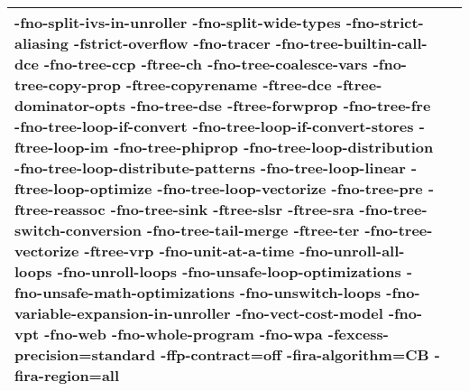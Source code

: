 \begin{tabular}{|l|p{6.2in}|}
-fno-split-ivs-in-unroller -fno-split-wide-types -fno-strict-aliasing \textbf{-fstrict-overflow} -fno-tracer -fno-tree-builtin-call-dce -fno-tree-ccp \textbf{-ftree-ch} -fno-tree-coalesce-vars -fno-tree-copy-prop \textbf{-ftree-copyrename} \textbf{-ftree-dce} \textbf{-ftree-dominator-opts} -fno-tree-dse \textbf{-ftree-forwprop} -fno-tree-fre -fno-tree-loop-if-convert -fno-tree-loop-if-convert-stores \textbf{-ftree-loop-im} -fno-tree-phiprop -fno-tree-loop-distribution -fno-tree-loop-distribute-patterns -fno-tree-loop-linear \textbf{-ftree-loop-optimize} -fno-tree-loop-vectorize -fno-tree-pre \textbf{-ftree-reassoc} -fno-tree-sink \textbf{-ftree-slsr} \textbf{-ftree-sra} -fno-tree-switch-conversion -fno-tree-tail-merge \textbf{-ftree-ter} -fno-tree-vectorize \textbf{-ftree-vrp} -fno-unit-at-a-time -fno-unroll-all-loops -fno-unroll-loops -fno-unsafe-loop-optimizations -fno-unsafe-math-optimizations -fno-unswitch-loops -fno-variable-expansion-in-unroller -fno-vect-cost-model -fno-vpt -fno-web -fno-whole-program -fno-wpa \textbf{-fexcess-precision=standard} \textbf{-ffp-contract=off} \textbf{-fira-algorithm=CB} \textbf{-fira-region=all} }\\
     \hline
    \end{tabular}    